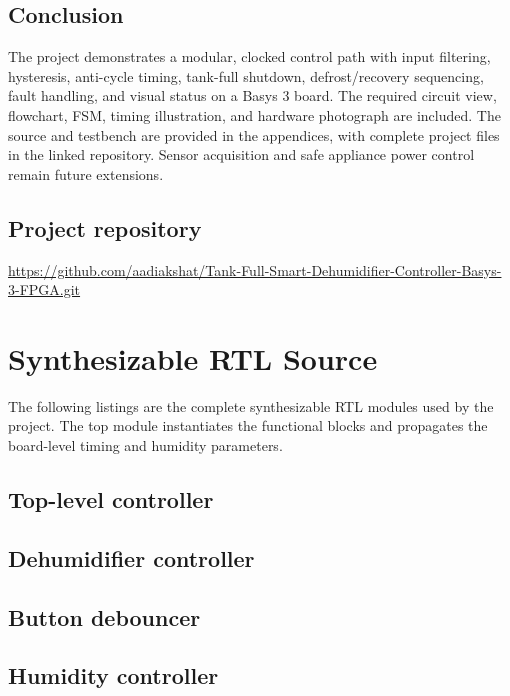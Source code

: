 \documentclass[11pt,a4paper]{article}
\newcommand{\repoURL}{https://github.com/aadiakshat/Tank-Full-Smart-Dehumidifier-Controller-Basys-3-FPGA.git}
\begin{document}
\subsection{Conclusion}
The project demonstrates a modular, clocked control path with input filtering, hysteresis, anti-cycle timing, tank-full shutdown, defrost/recovery sequencing, fault handling, and visual status on a Basys 3 board. The required circuit view, flowchart, FSM, timing illustration, and hardware photograph are included. The source and testbench are provided in the appendices, with complete project files in the linked repository. Sensor acquisition and safe appliance power control remain future extensions.

\subsection{Project repository}
\url{\repoURL}

\clearpage
\appendix
\section{Synthesizable RTL Source}
The following listings are the complete synthesizable RTL modules used by the project. The top module instantiates the functional blocks and propagates the board-level timing and humidity parameters.

\subsection{Top-level controller}


\subsection{Dehumidifier controller}


\subsection{Button debouncer}


\subsection{Humidity controller}

\end{document}
